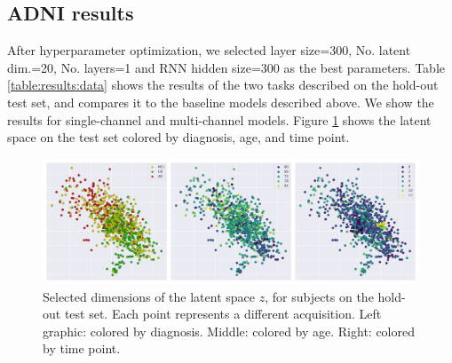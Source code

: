 \subsection{ADNI results}

After hyperparameter optimization, we selected layer size=300, No. latent dim.=20, No. layers=1 and RNN hidden size=300 as the best parameters. Table \ref{table:results:data} shows the results of the two tasks described on the hold-out test set, and compares it to the baseline models described above. We show the results for single-channel and multi-channel models. Figure \ref{fig:rnn:latent} shows the latent space on the test set colored by diagnosis, age, and time point. 

\begin{table}[!htbp]
\centering
{}
\caption[Performance of the model.]{Performance of the models on longitudinal prediction and channel reconstruction, compared to baseline methods. RVAE: single-channel model.  MC-RVAE: multiple channel model. All values are mean absolute error (MAE) over each subject and time point.} \label{table:results:data}
\end{table}


\begin{figure}[!htbp]
  \centering
  \includegraphics[width=1.0\textwidth]{figures/rnnvae/latent_space_fig.png}
  \caption[Latent space for the test set.]{Selected dimensions of the latent space $z$, for subjects on the hold-out test set. Each point represents a different acquisition. Left graphic: colored by diagnosis. Middle: colored by age. Right: colored by time point.}\label{fig:rnn:latent}
\end{figure}

